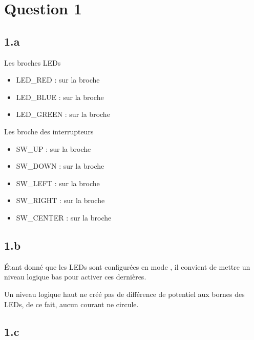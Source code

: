 
 \section{Question 1}

\subsection{1.a}

Les broches LEDs 

\begin{itemize}

  \item LED\_RED :  sur la broche 
  \item LED\_BLUE :  sur la broche 
  \item LED\_GREEN :  sur la broche 

\end{itemize}

Les broche des interrupteurs 

\begin{itemize}

  \item SW\_UP :  sur la broche 
  \item SW\_DOWN :  sur la broche 
  \item SW\_LEFT :  sur la broche 
  \item SW\_RIGHT :  sur la broche 
  \item SW\_CENTER :  sur la broche 

\end{itemize}

\subsection{1.b}

Étant donné que les LEDs sont configurées en mode , 
il convient de mettre un niveau logique bas pour activer ces dernières. \\


Un niveau logique haut ne créé pas de différence de potentiel aux bornes des LEDs, de ce fait, aucun courant ne circule.
  
\subsection{1.c}

